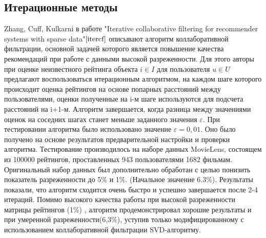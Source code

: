 \documentclass[12pt]{article} %
\begin{document}
\subsection{Итерационные методы}
\par
Zhang, Cuff, Kulkarni в работе "Iterative collaborative filtering for recommender systems with sparse data"$\cite{itercf}$ описывают алгоритм коллаборативной фильтрации, основной задачей которого является повышение качества рекомендаций при работе с данными высокой разреженности. Для этого авторы при оценке неизвестного рейтинга объекта $i \in I$ для пользователя $u \in U$ предлагают воспользоваться итерационным алгоритмом, на каждом шаге которого происходит оценка рейтингов на основе попарных расстояний между пользователями, оценки полученные на i-м шаге используются для подсчета расстояний на i+1-м. Алгоритм завершается, когда разница между значениями оценок на соседних шагах станет меньше заданного значения $\varepsilon$. При тестировании алгоритма было использовано значение $\varepsilon=0,01$. Оно было получено на основе результатов предварительной настройки и проверки алгоритма. Тестирование производилось на наборе данных MovieLens, состоящем из 100000 рейтингов, проставленных 943 пользователями 1682 фильмам. Оригинальный набор данных был дополнительно обработан с целью понизить показатель разреженности до 5\% и 1\%. (Начальное значение 6.3\%). Результаты показали, что алгоритм сходится очень быстро и успешно завершается после 2-4 итераций. Помимо высокого качества работы при высокой разреженности матрицы рейтингов (1\%) , алгоритм продемонстрировал хорошие результаты и при умеренной разреженности(6,3\%), уступив только модифицированному с использованием коллаборативной фильтрации SVD-алгоритму\cite{cfbasedsvd}.
\end{document}
